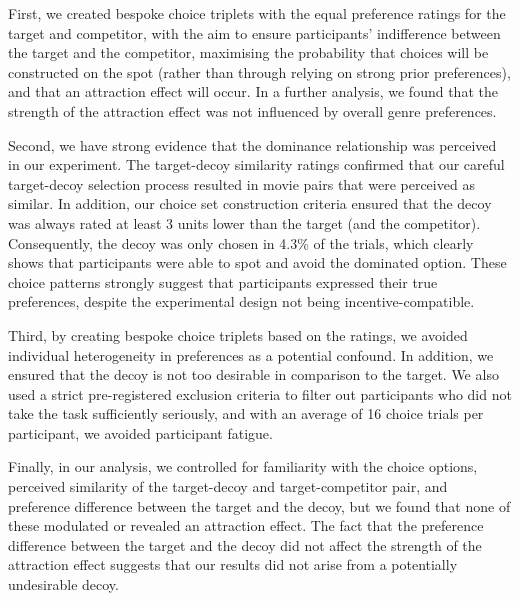 \documentclass[12pt, a4paper]{article}
\begin{document}

First, we created bespoke choice triplets with the equal preference ratings for the target and competitor, with the aim to ensure participants' indifference between the target and the competitor, maximising the probability that choices will be constructed on the spot (rather than through relying on strong prior preferences), and that an attraction effect will occur. 
In a further analysis, we found that the strength of the attraction effect was not influenced by overall genre preferences. 

Second, we have strong evidence that the dominance relationship was perceived in our experiment. The target-decoy similarity ratings confirmed that our careful target-decoy selection process resulted in movie pairs that were perceived as similar. In addition, our choice set construction criteria ensured that the decoy was always rated at least 3 units lower than the target (and the competitor). Consequently, the decoy was only chosen in 4.3\% of the trials, which clearly shows that participants were able to spot and avoid the dominated option. These choice patterns strongly suggest that participants expressed their true preferences, despite the experimental design not being incentive-compatible.

Third, by creating bespoke choice triplets based on the ratings, we avoided individual heterogeneity in preferences as a potential confound. In addition, we ensured that the decoy is not too desirable in comparison to the target. We also used a strict pre-registered exclusion criteria to filter out participants who did not take the task sufficiently seriously, and with an average of 16 choice trials per participant, we avoided participant fatigue.

Finally, in our analysis, we controlled for familiarity with the choice options, perceived similarity of the target-decoy and target-competitor pair, and preference difference between the target and the decoy, but we found that none of these modulated or revealed an attraction effect. The fact that the preference difference between the target and the decoy did not affect the strength of the attraction effect suggests that our results did not arise from a potentially undesirable decoy. 
\end{document}
